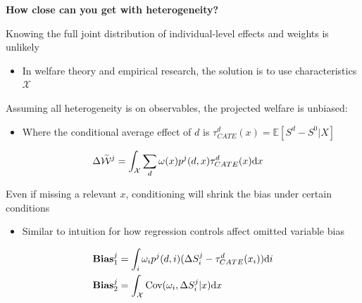 \documentclass[t,aspectratio=169,11pt,presentation]{beamer}
\newenvironment{wideitemize}{\itemize\addtolength{\itemsep}{14pt}}{\enditemize}
\begin{document}
\begin{frame}{\textbf{How close can you get with heterogeneity?}}
\begin{wideitemize}
    \item Knowing the full joint distribution of individual-level effects and weights is unlikely
 \begin{itemize}
     \item In welfare theory and empirical research, the solution is to use characteristics $\mathcal{X}$
 \end{itemize}

\item<2-> Assuming all heterogeneity is on observables, the projected welfare is unbiased:
\begin{itemize}
    \item Where the conditional average effect of $d$ is $\tau^d_{CATE}(x)=\mathbb{E}[S^d-S^0|X]$
\end{itemize}
    \begin{align*}
         \Delta \accentset{\sim}{\mathcal{W}}^j &= \int_\mathcal{X} \sum_d \omega(x) p^j(d,x) \tau^d_{CATE}(x)\text{d}x
    \end{align*}
     \item<3-> Even if missing a relevant $x$, conditioning will shrink the bias under certain conditions
     \begin{itemize}
         \item Similar to intuition for how regression controls affect omitted variable bias
     \end{itemize}
    \begin{align*}
     \text{\textbf{Bias}}^j_1 &= \int_i \omega_i p^j(d,i) (\Delta S^j_i-\tau^d_{CATE}(x_i))\text{d}i  \\
     \text{\textbf{Bias}}^j_2 &= \int_\mathcal{X} \text{Cov}(\omega_i,\Delta S^j_i|x) \text{d}x 
    \end{align*}  

       

\end{wideitemize}
    
\end{frame}
\end{document}
